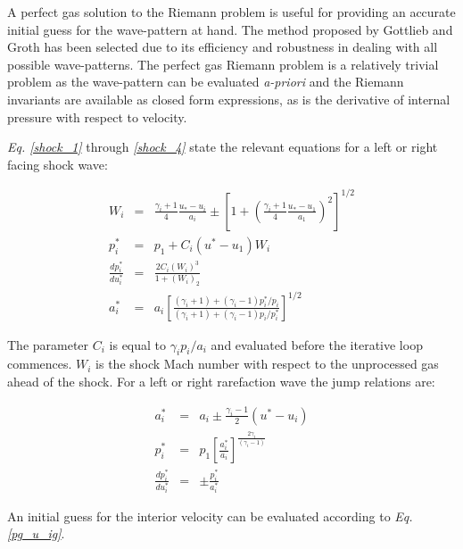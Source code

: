 \documentclass[a4paper,10pt]{article}
\begin{document}
A perfect gas solution to the Riemann problem is useful for providing an accurate initial guess for the wave-pattern at hand.  The method proposed by Gottlieb and Groth \cite{gottlieb} has been selected due to its efficiency and robustness in
dealing with all possible wave-patterns.  The perfect gas Riemann problem is a relatively trivial problem as the wave-pattern can be evaluated \emph{a-priori} and the Riemann invariants are available as closed form expressions, as is the derivative of internal pressure with respect to velocity.

\par \medskip

\emph{Eq. \ref{shock_1}} through \emph{\ref{shock_4}} state the relevant equations for a left or right facing shock wave:

\par

\begin{eqnarray}
W_{i} &=& \frac{\gamma_{i} +1}{4} \frac{u_{*}-u_{i}}{a_{i}} \pm \left [ 1 + \left ( \frac{\gamma_{i} +1 }{4} \frac{u_{*}-u_{1}}{a_{1}} \right ) ^{2} \right] ^{1/2} \label{shock_1} \\
p_{i}^{*} &=& p_{1} + C_{i} ( u^{*} - u_{1} ) W_{i} \label{shock_2} \\
\frac{d p_{i}^{*}}{ d u_{i}^{*}} &=& \frac{2 C_{i} (W_{i})^{3}}{1+(W_{i})_{2}} \label{shock_3} \\
a_{i}^{*} &=& a_{i} \left [ \frac{ (\gamma_{i} + 1) + (\gamma_{i} - 1) p_{i}^{*} / p_{i} }{ (\gamma_{i} + 1) + (\gamma_{i} - 1) p_{i} / p_{i}^{*} } \right ] ^{1/2} \label{shock_4}
\end{eqnarray}

The parameter $C_{i}$ is equal to $\gamma_{i} p_{i} / a_{i} $ and evaluated before the iterative loop commences.  $W_{i}$ is the shock Mach number with respect to the unprocessed gas ahead of the shock.  For a left or right rarefaction wave the jump relations are:

\begin{eqnarray}
a_{i}^{*} &=& a_{i} \pm \frac{\gamma_{i} - 1}{2} (u^{*} - u_{i}) \label{rare_1} \\
p_{i}^{*} &=& p_{1} \left [ \frac{a_{i}^{*}}{a_{i}} \right ] ^{\frac{2 \gamma _{i} }{(\gamma_{i} -1) }} \label{rare_2} \\
\frac{d p_{i}^{*}}{ d u_{i}^{*}} &=& \pm \frac{p_{i}^{*}}{a_{i}^{*}} \label{rare_3}
\end{eqnarray}

An initial guess for the interior velocity can be evaluated according to \emph{Eq. \ref{pg_u_ig}}.
\end{document}
